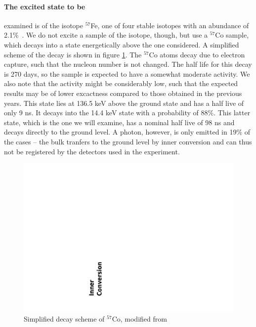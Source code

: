 \paragraph{The excited state to be}
examined is of the isotope $^{57}$Fe, one of four stable isotopes 
with an abundance of 2.1\%~\cite{nist}. We do not excite a sample of the isotope, though, but 
use a $^{57}$Co sample, which decays into a state energetically above the one considered. 
A simplified scheme of the decay is shown in figure \ref{fig:decay_scheme_Co}.
The $^{57}$Co atoms decay due to electron capture, such that the nucleon number is not changed. 
The half life for this decay is 270 days, so the sample is expected to have a somewhat 
moderate activity. We also note that the activity might be considerably low, 
such that the expected results may be of lower excactness compared to those obtained in 
the previous years.
This state lies at 136.5 keV above the ground state and has a half live of only 9 ns. 
It decays into the 14.4 keV state with a probability of 88\%. This latter state, which is the one 
we will examine, has a nominal half live of 98 ns and decays directly to the ground level. 
A photon, however, is only emitted in 19\% of the cases -- the bulk tranfers to the ground level 
by inner conversion and can thus not be registered by the detectors used in the experiment.%
~\cite{ver}
\begin{figure}
    \begin{centering}
        \includegraphics[width=0.70\linewidth]{figures/decay_scheme_Co}
        \caption{Simplified decay scheme of $^{57}$Co, modified from~\cite{ver}}
        \label{fig:decay_scheme_Co}
    \end{centering}
\end{figure}

